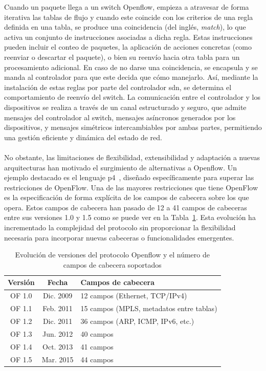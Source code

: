 Cuando un paquete llega a un switch Openflow, empieza a atravesar de forma iterativa las tablas de flujo y cuando este coincide con los criterios de una regla definida en una tabla, se produce una coincidencia (del inglés, \textit{match}), lo que activa un conjunto de instrucciones asociadas a dicha regla. Estas instrucciones pueden incluir el conteo de paquetes, la aplicación de acciones concretas (como reenviar o descartar el paquete), o bien su reenvío hacia otra tabla para un procesamiento adicional. En caso de no darse una coincidencia, se encapsula y se manda al controlador para que este decida que cómo manejarlo. Así, mediante la instalación de estas reglas por parte del controlador \gls{sdn}, se determina el comportamiento de reenvío del switch. La comunicación entre el controlador y los dispositivos se realiza a través de un canal estructurado y seguro, que admite mensajes del controlador al switch, mensajes asíncronos generados por los dispositivos, y mensajes simétricos intercambiables por ambas partes, permitiendo una gestión eficiente y dinámica del estado de red.\\
\\
No obstante, las limitaciones de flexibilidad, extensibilidad y adaptación a nuevas arquitecturas han motivado el surgimiento de alternativas a Openflow. Un ejemplo destacado es el lenguaje \gls{p4}~\cite{bosshart2014p4}, diseñado específicamente para superar las restricciones de OpenFlow. Una de las mayores restricciones que tiene OpenFlow es la especificación de forma explícita de los campos de cabecera sobre los que opera. Estos campos de cabecera han pasado de 12 a 41 campos de cabeceras entre sus versiones 1.0 y 1.5 como se puede ver en la Tabla~\ref{tab:openflow_versions}. Esta evolución ha incrementado la complejidad del protocolo sin proporcionar la flexibilidad necesaria para incorporar nuevas cabeceras o funcionalidades emergentes. 

\begin{table}[ht!]
\centering
\begin{tabular}{|c|c|l|}
\hline
\textbf{Versión} & \textbf{Fecha} & \textbf{Campos de cabecera} \\ \hline
OF 1.0 & Dic. 2009 & 12 campos (Ethernet, TCP/IPv4) \\ \hline
OF 1.1 & Feb. 2011 & 15 campos (MPLS, metadatos entre tablas) \\ \hline
OF 1.2 & Dic. 2011 & 36 campos (ARP, ICMP, IPv6, etc.) \\ \hline
OF 1.3 & Jun. 2012 & 40 campos \\ \hline
OF 1.4 & Oct. 2013 & 41 campos \\ \hline
OF 1.5 & Mar. 2015 & 44 campos \\ \hline
\end{tabular}
\caption{Evolución de versiones del protocolo Openflow y el número de campos de cabecera soportados}    
\label{tab:openflow_versions}
\end{table}

